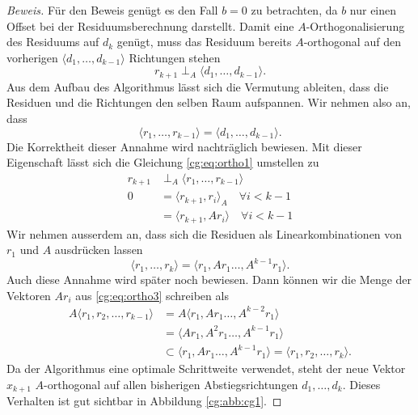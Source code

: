 \begin{proof}[Beweis]
Für den Beweis genügt es den Fall $b=0$ zu betrachten, da $b$ nur einen Offset bei der Residuumsberechnung darstellt.
Damit eine $A$-Orthogonalisierung des Residuums auf $d_k$ genügt, muss das Residuum bereits $A$-orthogonal auf den vorherigen $\langle d_1, \dots ,d_{k-1} \rangle$ Richtungen stehen
\begin{equation} \label{cg:eq:ortho1}
	r_{k+1} \perp_A \langle d_1, \dots ,d_{k-1} \rangle.
\end{equation} 
Aus dem Aufbau des Algorithmus lässt sich die Vermutung ableiten, dass die Residuen und die Richtungen den selben Raum aufspannen.
Wir nehmen also an, dass
\begin{equation}\label{cg:eq:ortho2}
\langle r_1, \dots ,r_{k-1} \rangle 
= 
\langle d_1, \dots ,d_{k-1} \rangle.
\end{equation}
Die Korrektheit dieser Annahme wird nachträglich bewiesen. 
Mit dieser Eigenschaft lässt sich die Gleichung \eqref{cg:eq:ortho1} umstellen zu
\begin{align}\label{cg:eq:ortho3}
	r_{k+1} 	&\perp_A \langle r_1, \dots ,r_{k-1} \rangle \nonumber \\
	0 			&= \langle r_{k+1}, r_i \rangle_A \quad \forall i < k-1 \nonumber\\
				&= \langle r_{k+1}, Ar_i \rangle \quad \forall i < k-1 
\end{align} 
Wir nehmen ausserdem an, dass sich die Residuen als Linearkombinationen von $r_1$ und $A$ ausdrücken lassen
\begin{equation}
	\langle r_1, \dots ,r_k \rangle = \langle r_1, Ar_1 \dots ,A^{k-1}r_1 \rangle.
\end{equation}
Auch diese Annahme wird später noch bewiesen.
Dann können wir die Menge der Vektoren $Ar_i$ aus \eqref{cg:eq:ortho3} schreiben als
\begin{align}\label{cg:eq:ortho4}
	A \langle r_1, r_2, \dots , r_{k-1} \rangle &= A \langle r_1, Ar_1 \dots ,A^{k-2}r_1 \rangle \nonumber\\
												&= \langle Ar_1, A^2r_1 \dots ,A^{k-1}r_1 \rangle \nonumber\\
												&\subset \langle r_1, Ar_1 \dots ,A^{k-1}r_1 \rangle = \langle r_1, r_2, \dots , r_k \rangle.
\end{align} 
Da der Algorithmus eine optimale Schrittweite verwendet, steht der neue Vektor $x_{k+1}$ $A$-orthogonal auf allen bisherigen Abstiegsrichtungen $d_1, \dots, d_k$.
Dieses Verhalten ist gut sichtbar in Abbildung \ref{cg:abb:cg1}.

\end{proof}
